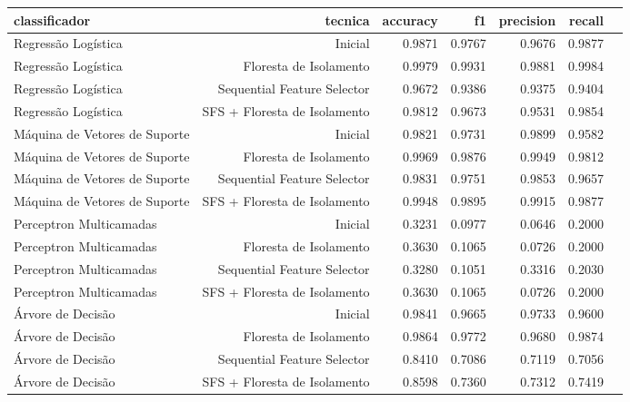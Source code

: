 \begin{tabular}{|l|r|r|r|r|r|r|}
\hline
                 classificador &                       tecnica &  accuracy &      f1 &  precision &  recall \\
\hline
           Regressão Logística &                       Inicial &    0.9871 &  0.9767 &     0.9676 &  0.9877 \\
           Regressão Logística &        Floresta de Isolamento &    0.9979 &  0.9931 &     0.9881 &  0.9984 \\
           Regressão Logística &   Sequential Feature Selector &    0.9672 &  0.9386 &     0.9375 &  0.9404 \\
           Regressão Logística &  SFS + Floresta de Isolamento &    0.9812 &  0.9673 &     0.9531 &  0.9854 \\
 Máquina de Vetores de Suporte &                       Inicial &    0.9821 &  0.9731 &     0.9899 &  0.9582 \\
 Máquina de Vetores de Suporte &        Floresta de Isolamento &    0.9969 &  0.9876 &     0.9949 &  0.9812 \\
 Máquina de Vetores de Suporte &   Sequential Feature Selector &    0.9831 &  0.9751 &     0.9853 &  0.9657 \\
 Máquina de Vetores de Suporte &  SFS + Floresta de Isolamento &    0.9948 &  0.9895 &     0.9915 &  0.9877 \\
       Perceptron Multicamadas &                       Inicial &    0.3231 &  0.0977 &     0.0646 &  0.2000 \\
       Perceptron Multicamadas &        Floresta de Isolamento &    0.3630 &  0.1065 &     0.0726 &  0.2000 \\
       Perceptron Multicamadas &   Sequential Feature Selector &    0.3280 &  0.1051 &     0.3316 &  0.2030 \\
       Perceptron Multicamadas &  SFS + Floresta de Isolamento &    0.3630 &  0.1065 &     0.0726 &  0.2000 \\
             Árvore de Decisão &                       Inicial &    0.9841 &  0.9665 &     0.9733 &  0.9600 \\
             Árvore de Decisão &        Floresta de Isolamento &    0.9864 &  0.9772 &     0.9680 &  0.9874 \\
             Árvore de Decisão &   Sequential Feature Selector &    0.8410 &  0.7086 &     0.7119 &  0.7056 \\
             Árvore de Decisão &  SFS + Floresta de Isolamento &    0.8598 &  0.7360 &     0.7312 &  0.7419 \\
\hline
\end{tabular}
